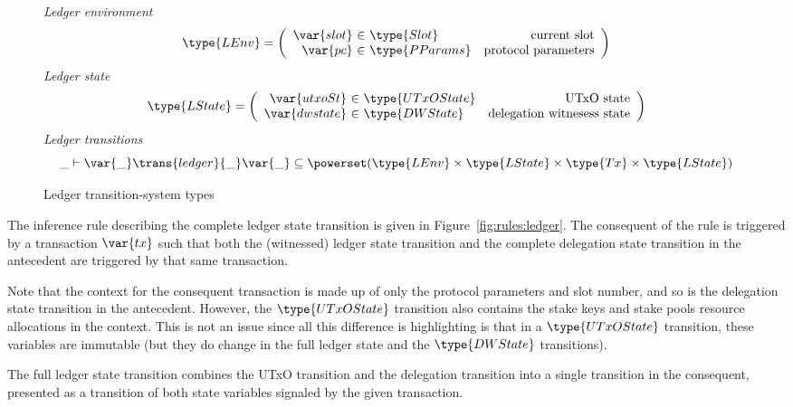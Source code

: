 \documentclass[11pt,a4paper,dvipsnames]{article}
\newcommand{\Tx}{\type{Tx}}
\newcommand{\PParams}{\type{PParams}}
\newcommand{\Slot}{\type{Slot}}
\newcommand{\UTxOState}{\ensuremath{\type{UTxOState}}}
\newcommand{\DWState}{\type{DWState}}
\newcommand{\LEnv}{\type{LEnv}}
\newcommand{\LState}{\type{LState}}
\theoremstyle{definition}
\theoremstyle{definition}
\begin{document}
\begin{figure}
  \emph{Ledger environment}
  \begin{equation*}
    \LEnv =
    \left(
      \begin{array}{r@{~\in~}lr}
        \var{slot} & \Slot & \text{current slot}\\
        \var{pc} & \PParams & \text{protocol parameters}\\
      \end{array}
    \right)
  \end{equation*}
  \emph{Ledger state}
  \begin{equation*}
    \LState =
    \left(
      \begin{array}{r@{~\in~}lr}
        \var{utxoSt} & \UTxOState & \text{UTxO state}\\
        \var{dwstate} & \DWState & \text{delegation witnesess state}\\
      \end{array}
    \right)
  \end{equation*}
  \emph{Ledger transitions}
  \begin{equation*}
    \_ \vdash
    \var{\_} \trans{ledger}{\_} \var{\_}
    \subseteq \powerset (\LEnv \times \LState \times \Tx \times \LState)
  \end{equation*}
  \caption{Ledger transition-system types}
  \label{fig:ts-types:ledger}
\end{figure}


The inference rule describing the complete ledger state transition is given in
Figure~\ref{fig:rules:ledger}. The consequent of the rule is triggered by
a transaction $\var{tx}$ such that both the (witnessed) ledger state transition
and the complete delegation state transition in the antecedent are
triggered by that same transaction.

Note that the context for the consequent transaction is made up of only the
protocol parameters and slot number, and so is the delegation state transition in
the antecedent. However, the $\UTxOState$ transition also contains the
stake keys and stake pools resource allocations in the context. This is not
an issue since all this difference is highlighting is that in a $\UTxOState$
transition, these variables are immutable (but they do change in the full
ledger state and the $\DWState$ transitions).

The full ledger state transition combines the UTxO transition and the
delegation transition into a single transition
in the consequent, presented as a transition of both state variables signaled
by the given transaction.
\end{document}
